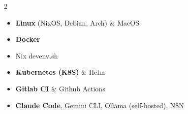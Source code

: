 \vspace{-4mm}
\begin{multicols}{2}
	\begin{itemize}[label=\textbullet]
		\item \textbf{Linux} (NixOS, Debian, Arch) \& MacOS
		\item \textbf{Docker}
		\item Nix devenv.sh
		\item \textbf{Kubernetes (K8S)} \& Helm
		\item \textbf{Gitlab CI} \& Github Actions
		\item \textbf{Claude Code}, Gemini CLI, Ollama (self-hosted), N8N
	\end{itemize}
\end{multicols}
